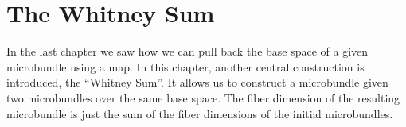 \chapter{The Whitney Sum}
\begin{myparagraph}
    In the last chapter we saw how we can pull back the base space of a given microbundle using a map.
    In this chapter, another central construction is introduced, the ``Whitney Sum''.
    It allows us to construct a microbundle given two microbundles over the same base space.
    The fiber dimension of the resulting microbundle is just the sum of the fiber dimensions of the initial microbundles.
\end{myparagraph}


